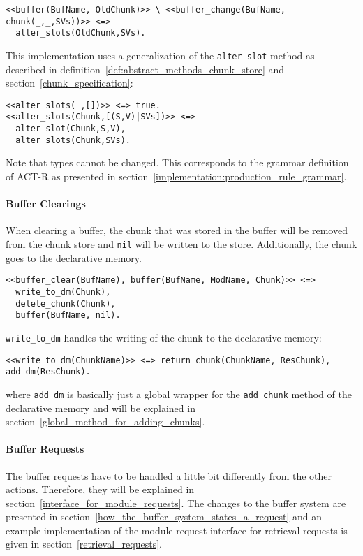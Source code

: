 \begin{lstlisting}
<<buffer(BufName, OldChunk)>> \ <<buffer_change(BufName, chunk(_,_,SVs))>> <=>
  alter_slots(OldChunk,SVs).
\end{lstlisting}

This implementation uses a generalization of the \lstinline|alter_slot| method as described in definition~\ref{def:abstract_methods_chunk_store} and section~\ref{chunk_specification}:

\begin{lstlisting}  
<<alter_slots(_,[])>> <=> true.
<<alter_slots(Chunk,[(S,V)|SVs])>> <=> 
  alter_slot(Chunk,S,V),
  alter_slots(Chunk,SVs). 
\end{lstlisting}

Note that types cannot be changed. This corresponds to the grammar definition of ACT-R as presented in section~\ref{implementation:production_rule_grammar}.

\paragraph{Buffer Clearings}

When clearing a buffer, the chunk that was stored in the buffer will be removed from the chunk store and \lstinline|nil| will be written to the store. Additionally, the chunk goes to the declarative memory.

\begin{lstlisting}
<<buffer_clear(BufName), buffer(BufName, ModName, Chunk)>> <=> 
  write_to_dm(Chunk), 
  delete_chunk(Chunk), 
  buffer(BufName, nil).
\end{lstlisting}

\lstinline|write_to_dm| handles the writing of the chunk to the declarative memory:

\begin{lstlisting}
<<write_to_dm(ChunkName)>> <=> return_chunk(ChunkName, ResChunk), add_dm(ResChunk).
\end{lstlisting}

where \lstinline|add_dm| is basically just a global wrapper for the \lstinline|add_chunk| method of the declarative memory and will be explained in section~\ref{global_method_for_adding_chunks}.

\paragraph{Buffer Requests} The buffer requests have to be handled a little bit differently from the other actions. Therefore, they will be explained in section~\ref{interface_for_module_requests}. The changes to the buffer system are presented in section~\ref{how_the_buffer_system_states_a_request} and an example implementation of the module request interface for retrieval requests is given in section~\ref{retrieval_requests}.


